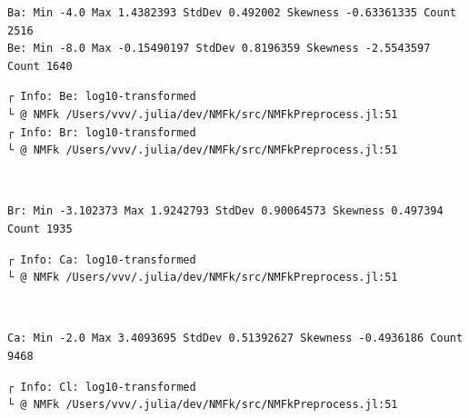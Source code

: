 \documentclass[11pt]{article}
\begin{document}
    \begin{Verbatim}[commandchars=\\\{\}]
Ba: Min -4.0 Max 1.4382393 StdDev 0.492002 Skewness -0.63361335 Count 2516
Be: Min -8.0 Max -0.15490197 StdDev 0.8196359 Skewness -2.5543597 Count 1640
    \end{Verbatim}

    \begin{Verbatim}[commandchars=\\\{\}]
┌ Info: Be: log10-transformed
└ @ NMFk /Users/vvv/.julia/dev/NMFk/src/NMFkPreprocess.jl:51
┌ Info: Br: log10-transformed
└ @ NMFk /Users/vvv/.julia/dev/NMFk/src/NMFkPreprocess.jl:51
    \end{Verbatim}

    \begin{center}
    \end{center}
    { \hspace*{\fill} \\}
    
    \begin{Verbatim}[commandchars=\\\{\}]
Br: Min -3.102373 Max 1.9242793 StdDev 0.90064573 Skewness 0.497394 Count 1935
    \end{Verbatim}

    \begin{Verbatim}[commandchars=\\\{\}]
┌ Info: Ca: log10-transformed
└ @ NMFk /Users/vvv/.julia/dev/NMFk/src/NMFkPreprocess.jl:51
    \end{Verbatim}

    \begin{center}
    \end{center}
    { \hspace*{\fill} \\}
    
    \begin{Verbatim}[commandchars=\\\{\}]
Ca: Min -2.0 Max 3.4093695 StdDev 0.51392627 Skewness -0.4936186 Count 9468
    \end{Verbatim}

    \begin{Verbatim}[commandchars=\\\{\}]
┌ Info: Cl: log10-transformed
└ @ NMFk /Users/vvv/.julia/dev/NMFk/src/NMFkPreprocess.jl:51
    \end{Verbatim}
\end{document}
